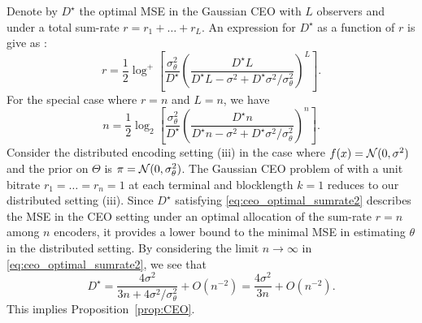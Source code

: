 %
Denote by $D^\star$ the optimal MSE in the Gaussian CEO with $L$ observers and under a total sum-rate $r = r_1 + \ldots +r_L$. An expression for $D^\star$ as a function of $r$ is give as \cite[Eq. 10]{chen2004upper}:
\begin{equation} \label{eq:ceo_optimal_sumrate}
r = \frac{1}{2} \log^+ \left[ \frac{\sigma_\theta^2}{D^\star} \left( \frac{D^\star L}{ D^\star L - \sigma^2 + D^\star \sigma^2 / \sigma_\theta^2 }\right)^L  \right].
\end{equation}
For the special case where $r = n$ and $L=n$, we have
\begin{equation} \label{eq:ceo_optimal_sumrate2}
n = \frac{1}{2} \log_2 \left[ \frac{\sigma_\theta^2}{D^\star} \left(\frac{ D^\star n }{D^\star n - \sigma^2 + D^\star \sigma^2/\sigma_\theta^2 }  \right)^n  \right].
\end{equation}
Consider the distributed encoding setting (iii) in the case where $f(x) = \mathcal{N}(0,\sigma^2)$ and the prior on $\Theta$ is $\pi = \mathcal{N}(0,\sigma_\theta^2)$. The Gaussian CEO problem of \cite{viswanathan1997quadratic} with a unit bitrate $r_1=\ldots = r_n =1$ at each terminal and blocklength $k=1$ reduces to our distributed setting (iii). Since $D^\star$ satisfying \eqref{eq:ceo_optimal_sumrate2} describes the MSE in the CEO setting under an optimal allocation of the sum-rate $r = n$ among $n$ encoders, it provides a lower bound to the minimal MSE in estimating $\theta$ in the distributed setting. By considering the limit $n\rightarrow \infty$ in \eqref{eq:ceo_optimal_sumrate2}, we see that 
\[
D^\star = \frac{ 4\sigma^2 }{3n + 4 \sigma^2 / \sigma_\theta^2 } + O(n^{-2}) =  \frac{4\sigma^2}{3n} + O(n^{-2}). 
\]
This implies Proposition~\ref{prop:CEO}. 
